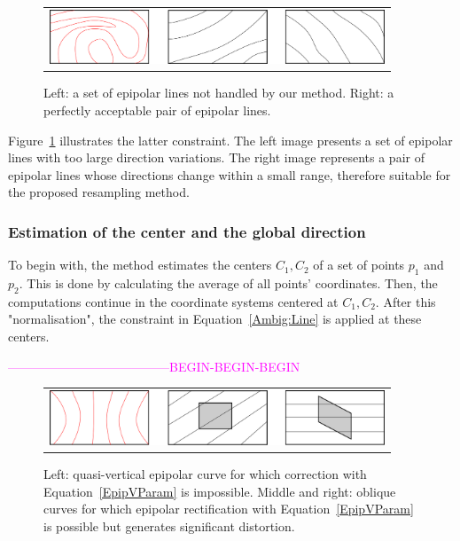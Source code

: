 \documentclass{ipol}
\newcommand{\BEGINCHANGE} {\textcolor{magenta}{ ---------------------------------------BEGIN-BEGIN-BEGIN}}
\begin{document}
\begin{figure}
\centering
\begin{tabular}{c}
\includegraphics[width=10cm]{FIGS/BadGoodLines.png}
\end{tabular}
\caption{Left: a set of epipolar lines not handled by our method. Right: a perfectly acceptable pair  of epipolar lines.}
\label{BadGoodEpip}
\end{figure}
%
Figure~\ref{BadGoodEpip} illustrates the latter constraint. The left image presents a set
of epipolar lines with too large direction variations. The right image represents a pair of epipolar lines whose directions change within a small range, therefore suitable for the proposed resampling method. 

\subsubsection{Estimation of the center and the global direction}

To begin with, the method estimates the centers  $C_1,C_2$ of a set of points $p_1$ and $p_2$. This is done by calculating the average of all points' coordinates.  Then, the computations continue in
the coordinate systems centered at $C_1,C_2$. After this "normalisation", the constraint in Equation~\ref{Ambig:Line} is applied at these centers.

\BEGINCHANGE{}

\begin{figure}
\centering
\begin{tabular}{c}
\includegraphics[width=10cm]{FIGS/EpipReqOrient.png}
\end{tabular}
\caption{Left: quasi-vertical epipolar curve for which correction with Equation~\eqref{EpipVParam} is impossible.  Middle and right: oblique curves for which epipolar rectification  with Equation~\eqref{EpipVParam} is possible
         but generates significant distortion.}
\label{ReqOrient}
\end{figure}
\end{document}
